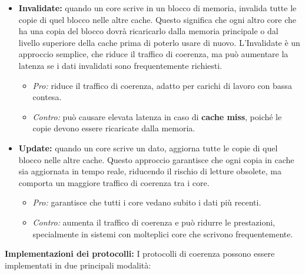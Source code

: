 \begin{itemize}
  \item \textbf{Invalidate:} quando un core scrive in un blocco di memoria, invalida tutte le copie di quel blocco nelle altre cache.  
        Questo significa che ogni altro core che ha una copia del blocco dovrà ricaricarlo dalla memoria principale o dal livello superiore della cache prima di poterlo usare di nuovo.  
        L'Invalidate è un approccio semplice, che riduce il traffico di coerenza, ma può aumentare la latenza se i dati invalidati sono frequentemente richiesti.
        \begin{itemize}
            \item \emph{Pro:} riduce il traffico di coerenza, adatto per carichi di lavoro con bassa contesa.
            \item \emph{Contro:} può causare elevata latenza in caso di \textbf{cache miss}, poiché le copie devono essere ricaricate dalla memoria.
        \end{itemize}
  
  \item \textbf{Update:} quando un core scrive un dato, aggiorna tutte le copie di quel blocco nelle altre cache.  
        Questo approccio garantisce che ogni copia in cache sia aggiornata in tempo reale, riducendo il rischio di letture obsolete, ma comporta un maggiore traffico di coerenza tra i core.
        \begin{itemize}
            \item \emph{Pro:} garantisce che tutti i core vedano subito i dati più recenti.
            \item \emph{Contro:} aumenta il traffico di coerenza e può ridurre le prestazioni, specialmente in sistemi con molteplici core che scrivono frequentemente.
        \end{itemize}
\end{itemize}

\textbf{Implementazioni dei protocolli:}  
I protocolli di coerenza possono essere implementati in due principali modalità:

